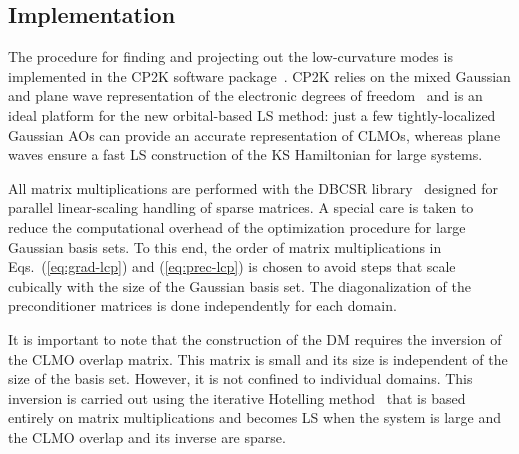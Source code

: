 \documentclass[aps,prl,twocolumn,reprint,amsmath,amssymb]{revtex4-1}
\begin{document}


\subsection{Implementation}

The procedure for finding and projecting out the low-curvature modes is implemented in the CP2K software package~\cite{cp2kgeneral}. CP2K relies on the mixed Gaussian and plane wave representation of the electronic degrees of freedom~\cite{vandevondele2005quickstep} and is an ideal platform for the new orbital-based LS method: just a few tightly-localized Gaussian AOs can provide an accurate representation of CLMOs, whereas plane waves ensure a fast LS construction of the KS Hamiltonian for large systems.

All matrix multiplications are performed with the DBCSR library~\cite{a:ls-dm-sign} designed for parallel linear-scaling handling of sparse matrices. %
A special care is taken to reduce the computational overhead of the optimization procedure for large Gaussian basis sets. 
To this end, the order of matrix multiplications in Eqs.~(\ref{eq:grad-lcp}) and (\ref{eq:prec-lcp}) is chosen to avoid steps that scale cubically with the size of the Gaussian basis set. 
The diagonalization of the preconditioner matrices is done independently for each domain. 

It is important to note that the construction of the DM requires the inversion of the CLMO overlap matrix. 
This matrix is small and its size is independent of the size of the basis set. 
However, it is not confined to individual domains. This inversion is carried out using the iterative Hotelling method~\cite{hotelling1943some} that is based entirely on matrix multiplications and becomes LS when the system is large and the CLMO overlap and its inverse are sparse. 
\end{document}
